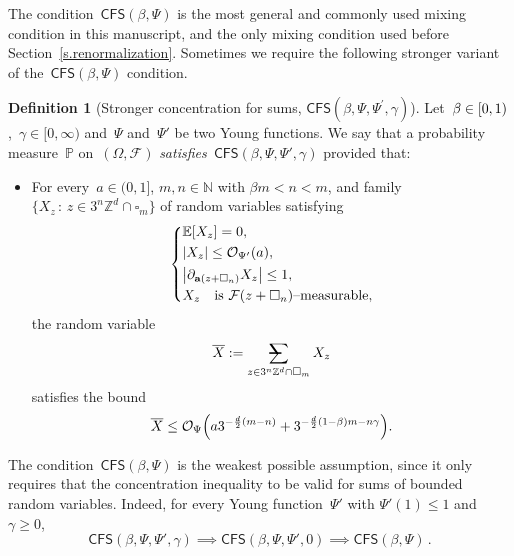 \documentclass[11pt]{article} %
\makeatletter
\let\oldsquare\square %
\renewcommand{\square}{\oldsquare}
\numberwithin{equation}{section}
\theoremstyle{definition}
\newtheorem{definition}[theorem]{Definition}
\let\originalleft\left
\let\originalright\right
\renewcommand{\left}{\mathopen{}\mathclose\bgroup\originalleft}
\renewcommand{\right}{\aftergroup\egroup\originalright}
\newcommand*{\N}{\ensuremath{\mathbb{N}}}
\newcommand*{\Zd}{\ensuremath{\mathbb{Z}^d}}
\renewcommand{\a}{\mathbf{a}}
\newcommand{\cu}{\square}
\newcommand{\F}{\mathcal{F}}
\renewcommand{\P}{\mathbb{P}}
\newcommand{\E}{\mathbb{E}}
\renewcommand{\O}{\mathcal{O}}
\newcommand{\avsum}{\mathop{\mathpalette\avsuminner\relax}\displaylimits}
\newcommand\avsuminner[2]{%
  {\sbox0{$\m@th#1\sum$}%
   \vphantom{\usebox0}%
   \ooalign{%
     \hidewidth
     \smash{\,\rule[.23em]{8.8pt}{1.1pt} \relax}%
     \hidewidth\cr
     $\m@th#1\sum$\cr
   }%
  }%
}
\newcommand{\CFS}{\mathsf{CFS}}
\makeatother
\begin{document}
The condition~$\CFS(\beta,\Psi)$ is the most general and commonly used mixing condition in this manuscript, and the only mixing condition used before Section~\ref{s.renormalization}. 
Sometimes we require the following stronger variant of the~$\CFS(\beta,\Psi)$ condition. 
\begin{definition}[Stronger concentration for sums, $\CFS(\beta,\Psi,\Psi^\prime,\gamma)$] \hspace{-2pt} 
\label{d.CFS.strong}
Let~$\beta \in \left[0,1\right)$,~$\gamma\in [0,\infty)$ and~$\Psi$ and~$\Psi'$ be two Young functions.
We say that a probability measure~$\P$ on~$(\Omega,\F)$ \emph{satisfies~$\CFS(\beta,\Psi,\Psi',\gamma)$} provided that: 
\begin{itemize}
\item
For every~$a\in (0,1]$, $m,n\in\N$ with $\beta m < n<m$, and  family $\{ X_z \,:\, z\in 3^n\Zd\cap \cu_m\}$ of random variables satisfying
\begin{equation} 
\label{e.CFS.strong.ass}
\left\{
\begin{aligned}
& \E\left[ X_z \right]=0, 
\\ & 
\left| X_z \right| \leq \O_{\Psi'}(a),
\\ &   
\left| \partial_{\a(z+\cu_n)} X_z\right| \leq 1,
\\
& X_z \quad \mbox{is $\F(z+\cu_n)$--measurable,}\\
\end{aligned}
\right.
\end{equation}
the random variable 
\begin{equation} 
\label{e.Z.strong.norm}
\overline{X}  :=  \avsum_{z\in 3^n\Zd\cap \cu_m}  X_z
\end{equation}
satisfies the bound
\begin{equation}
\label{e.strong.CFS}
\overline{X}
\leq
\O_{\Psi}\left( a 3^{-\frac d2(m-n)} 
+ 3^{-\frac d2(1-\beta)m - n\gamma} \right).
\end{equation}
\end{itemize}
\end{definition}

\smallskip

The condition~$\CFS(\beta,\Psi)$ is the weakest possible assumption, since it only requires that the concentration inequality to be valid for sums of bounded random variables. Indeed, for every Young function~$\Psi'$ with $\Psi'(1) \leq 1$ and~$\gamma\geq 0$,
\begin{equation*}
\CFS(\beta,\Psi,\Psi',\gamma) 
\implies
\CFS(\beta,\Psi,\Psi',0)
\implies
\CFS(\beta,\Psi)
\,.
\end{equation*}
\end{document}
